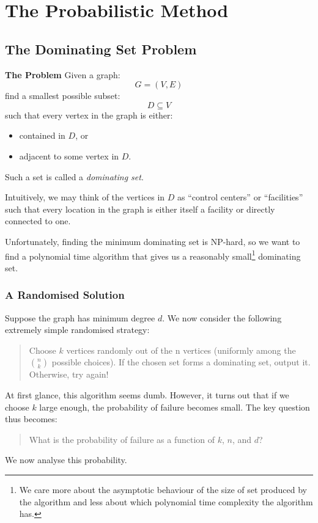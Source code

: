 \documentclass[11pt,openany]{book}
\begin{document}
\chapter{The Probabilistic Method}

\section{The Dominating Set Problem}

\textbf{The Problem}
Given a graph:
\[
G=(V,E)
\]
find a smallest possible subset:
\[
D\subseteq V
\]
such that every vertex in the graph is either:
\begin{itemize}
    \item contained in \(D\), or
    \item adjacent to some vertex in \(D\).
\end{itemize}

Such a set is called a \emph{dominating set}.

Intuitively, we may think of the vertices in \(D\) as ``control centers'' or ``facilities'' such that every location in the graph is either itself a facility or directly connected to one.

Unfortunately, finding the minimum dominating set is NP-hard, so we want to find a polynomial time algorithm that gives us a 
reasonably small\footnote{We care more about the asymptotic behaviour of the size of set produced by the algorithm and less about which polynomial time complexity the algorithm has.} dominating set.
\subsection*{A Randomised Solution}

Suppose the graph has minimum degree \(d\). We now consider the following extremely simple randomised strategy:

\begin{quote}
Choose \(k\) vertices randomly out of the n vertices (uniformly among the $\binom{n}{k}$ possible choices).
If the chosen set forms a dominating set, output it. Otherwise, try again!
\end{quote}
At first glance, this algorithm seems dumb. 
However, it turns out that if we choose \(k\) large enough, the probability of failure becomes small.
The key question thus becomes:
\begin{quote}
What is the probability of failure as a function of \(k\), \(n\), and \(d\)?
\end{quote}
We now analyse this probability.
\end{document}
